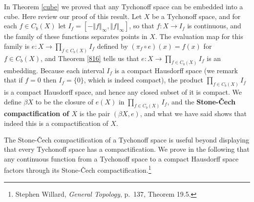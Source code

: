 \documentclass{article}
\newcommand{\norm}[1]{\left\Vert #1 \right\Vert}
\theoremstyle{definition}
\begin{document}
In Theorem \ref{cube} we proved that any Tychonoff space can be embedded into a cube. 
Here review our proof of this result. Let $X$  be a Tychonoff space, and
for each $f \in C_b(X)$ let $I_f = [-\norm{f}_\infty,\norm{f}_\infty]$,
so that $f:X \to I_f$ is continuous, and the family of these functions separates points
in $X$. The evaluation map for this family is $e:X \to \prod_{f \in C_b(X)} I_f$ defined
by $(\pi_f \circ e)(x)=f(x)$ for $f \in C_b(X)$, and Theorem \ref{816} tells us that 
$e:X \to \prod_{f \in C_b(X)} I_f$ is an embedding. 
Because each interval $I_f$ is a compact Hausdorff space (we remark that if $f=0$ then $I_f=\{0\}$, which is indeed compact),
the product $\prod_{f \in C_b(X)} I_f$ is a compact Hausdorff space, and hence any closed
subset of it is compact. We define $\beta X$ to be the closure of $e(X)$ in $\prod_{f \in C_b(X)} I_f$,
and the \textbf{Stone-\v{C}ech compactification of $X$} is the pair $(\beta X,e)$, and what
we have said shows that indeed this is a compactification of $X$. 

The Stone-\v{C}ech compactification of a Tychonoff space is useful beyond displaying
that every Tychonoff space has a compactification.
We prove in the following that any continuous function from a Tychonoff space to a compact Hausdorff space
factors through its Stone-\v{C}ech compactification.\footnote{Stephen Willard, {\em General Topology}, p.~137, Theorem 19.5.} 
\end{document}
